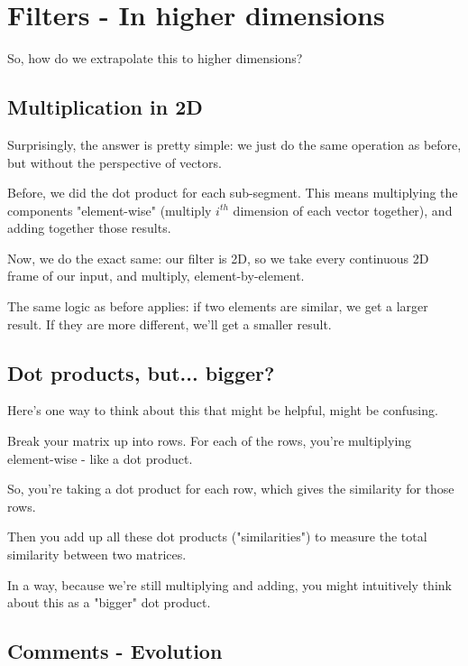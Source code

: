     
\section{Filters - In higher dimensions}
    
    So, how do we extrapolate this to higher dimensions?
    
    \subsection{Multiplication in 2D}
    
        Surprisingly, the answer is pretty simple: we just do the same operation as before, but without the perspective of vectors.
        
        Before, we did the dot product for each sub-segment. This means multiplying the components "element-wise" (multiply $i^{th}$ dimension of each vector together), and adding together those results.
        
        Now, we do the exact same: our filter is 2D, so we take every continuous 2D frame of our input, and multiply, element-by-element.
        
        The same logic as before applies: if two elements are similar, we get a larger result. If they are more different, we'll get a smaller result.
    
    \subsection{Dot products, but... bigger?}
    
        Here's one way to think about this that might be helpful, might be confusing. 
        
        Break your matrix up into rows. For each of the rows, you're multiplying element-wise - like a dot product.
        
        So, you're taking a dot product for each row, which gives the similarity for those rows. 
        
        Then you add up all these dot products ("similarities") to measure the total similarity between two matrices.
        
        In a way, because we're still multiplying and adding, you might intuitively think about this as a "bigger" dot product.
        
    
    \subsection{Comments - Evolution}
    
